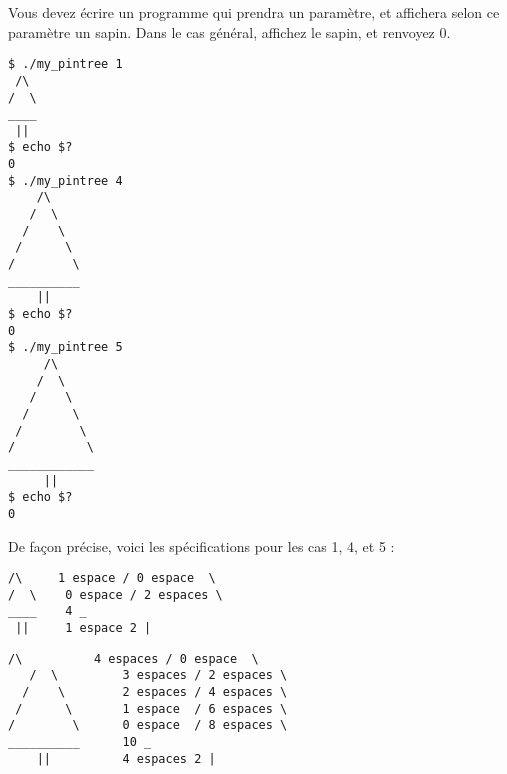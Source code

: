 

\vspace*{0.7cm}

\noindent {}

\bigskip

\noindent Vous devez écrire un programme qui prendra un paramètre, et affichera selon ce paramètre un sapin.
\noindent Dans le cas général, affichez le sapin, et renvoyez 0.

\bigskip

\lstset{language=sh}
\begin{lstlisting}[frame=single,title={Cas général}]
$ ./my_pintree 1
 /\
/  \
____
 ||
$ echo $?
0
$ ./my_pintree 4
    /\
   /  \
  /    \
 /      \
/        \
__________
    ||
$ echo $?
0
$ ./my_pintree 5
     /\
    /  \
   /    \
  /      \
 /        \
/          \
____________
     ||
$ echo $?
0
\end{lstlisting}

\newpage

\noindent De façon précise, voici les spécifications pour les cas 1, 4, et 5 :

\bigskip

\hspace*{-\parindent} %
\begin{minipage}{15.85cm} %
\lstset{language=sh}
\begin{lstlisting}[frame=single,title={Cas général 1}]
 /\     1 espace / 0 espace  \
/  \    0 espace / 2 espaces \
____    4 _
 ||     1 espace 2 |
\end{lstlisting}
\end{minipage} %

\hspace*{-\parindent} %
\begin{minipage}{15.85cm} %
\lstset{language=sh}
\begin{lstlisting}[frame=single,title={Cas général 4}]
    /\          4 espaces / 0 espace  \
   /  \         3 espaces / 2 espaces \
  /    \        2 espaces / 4 espaces \
 /      \       1 espace  / 6 espaces \
/        \      0 espace  / 8 espaces \
__________      10 _
    ||          4 espaces 2 |
\end{lstlisting}
\end{minipage} %


